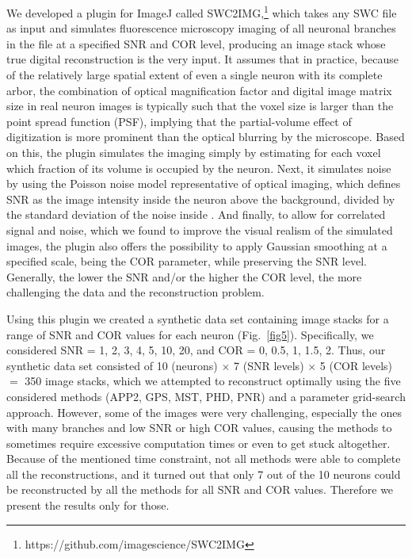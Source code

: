 We developed a plugin for ImageJ \cite{schneider2012} called SWC2IMG,\footnote{https://github.com/imagescience/SWC2IMG} which takes any SWC file as input and simulates fluorescence microscopy imaging of all neuronal branches in the file at a specified SNR and COR level, producing an image stack whose true digital reconstruction is the very input. It assumes that in practice, because of the relatively large spatial extent of even a single neuron with its complete arbor, the combination of optical magnification factor and digital image matrix size in real neuron images is typically such that the voxel size is larger than the point spread function (PSF), implying that the partial-volume effect of digitization is more prominent than the optical blurring by the microscope. Based on this, the plugin simulates the imaging simply by estimating for each voxel which fraction of its volume is occupied by the neuron. Next, it simulates noise by using the Poisson noise model representative of optical imaging, which defines SNR as the image intensity inside the neuron above the background, divided by the standard deviation of the noise inside \cite{sheppard2006}. And finally, to allow for correlated signal and noise, which we found to improve the visual realism of the simulated images, the plugin also offers the possibility to apply Gaussian smoothing at a specified scale, being the COR parameter, while preserving the SNR level. Generally, the lower the SNR and/or the higher the COR level, the more challenging the data and the reconstruction problem.

Using this plugin we created a synthetic data set containing image stacks for a range of SNR and COR values for each neuron (Fig.~\ref{fig5}). Specifically, we considered SNR = 1, 2, 3, 4, 5, 10, 20, and COR = 0, 0.5, 1, 1.5, 2. Thus, our synthetic data set consisted of 10 (neurons) $\times$ 7 (SNR levels) $\times$ 5 (COR levels) $=$ 350 image stacks, which we attempted to reconstruct optimally using the five considered methods (APP2, GPS, MST, PHD, PNR) and a parameter grid-search approach. However, some of the images were very challenging, especially the ones with many branches and low SNR or high COR values, causing the methods to sometimes require excessive computation times or even to get stuck altogether. Because of the mentioned time constraint, not all methods were able to complete all the reconstructions, and it turned out that only 7 out of the 10 neurons could be reconstructed by all the methods for all SNR and COR values. Therefore we present the results only for those.

